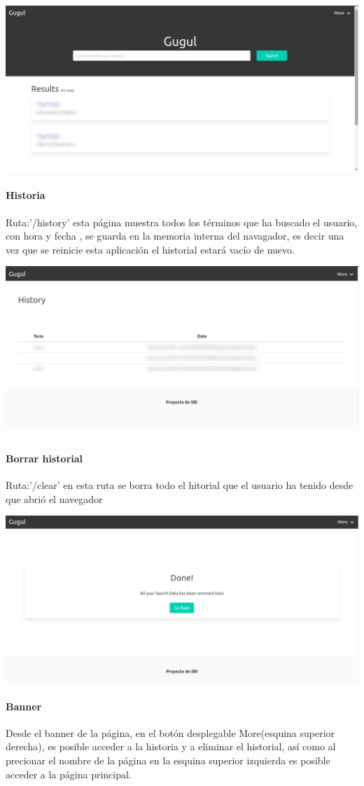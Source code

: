 \documentclass{llncs}
\begin{document}
\begin{center}
	\includegraphics[width=0.5\linewidth]{img/pagprincipal.png} 
\end{center}


\paragraph{Historia}
Ruta:'/history' esta p\'agina muestra todos los t\'erminos que ha buscado el usuario, con hora y fecha , se guarda en la memoria interna del navagador, es decir una vez que se reinicie esta aplicaci\'on el historial estar\'a vac\'io de nuevo.

\begin{center}
	\includegraphics[width=0.5\linewidth]{img/history.png} 
\end{center}


\paragraph{Borrar historial}
Ruta:'/clear' en esta ruta se borra todo el hitorial que el usuario ha tenido desde que abri\'o el navegador

\begin{center}
	\includegraphics[width=0.5\linewidth]{img/clear.png} 
\end{center}

\paragraph{Banner}
Desde el banner de la p\'agina, en el botón desplegable More(esquina superior derecha), es posible acceder a la historia y a eliminar el historial, así como al precionar el nombre de la p\'agina en la esquina superior izquierda es posible acceder a la página principal.
\end{document}
